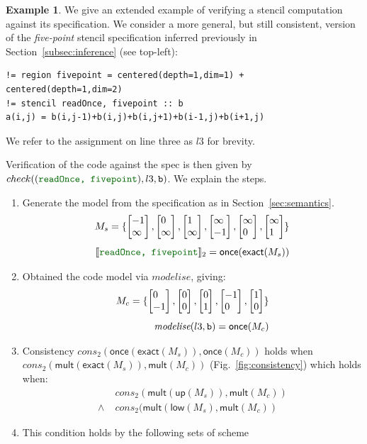 \documentclass[9pt]{sigplanconf}
\newcounter{block}
\theoremstyle{definition}
\newtheorem{example}[block]{Example}
\newcommand{\interp}[1]{\llbracket{#1}\rrbracket}
\newcommand{\vtwo}[2]{\setlength{\arraycolsep}{0em}
\left[\begin{array}{l}#1\\#2\end{array}\right]}
\begin{document}
\begin{example}
We give an extended example of verifying a stencil computation against
its specification. We consider a more general, but still consistent, version of the \textit{five-point}
stencil specification inferred previously in
Section~\ref{subsec:inference} (see top-left):
%
\begin{verbatim}
!= region fivepoint = centered(depth=1,dim=1) + centered(depth=1,dim=2)
!= stencil readOnce, fivepoint :: b
a(i,j) = b(i,j-1)+b(i,j)+b(i,j+1)+b(i-1,j)+b(i+1,j)
\end{verbatim}
%
We refer to the assignment on line three as $l3$ for brevity.

Verification of the code against the spec is then given by 
$check(({\textcolor{darkgreen}{\texttt{readOnce, fivepoint}}}),l3,\texttt{b})$. 
We explain the steps.
\begin{enumerate}  
%
\item Generate the model from the specification as in
  Section~\ref{sec:semantics}. 
%
\begin{align*}
 M_s= \{  \vtwo{-1}{\infty},
          \vtwo{0}{\infty},
          \vtwo{1}{\infty},
          \vtwo{\infty}{-1},
          \vtwo{\infty}{0},
        \vtwo{\infty}{1} \}  \\[0.4em]
\interp{{\textcolor{darkgreen}{\texttt{readOnce, fivepoint}}}}_2 =
  \textsf{once}(\textsf{exact} (M_s))
\end{align*}
%
\item Obtained the code model via $\textit{modelise}$, giving:
%
\begin{align*}
M_c = \{
    \vtwo{0}{-1},
    \vtwo{0}{0},
    \vtwo{0}{1},
    \vtwo{-1}{0},
    \vtwo{1}{0}
  \}
\\[0.4em]
\textit{modelise}(l3, \texttt{b}) = \textsf{once} (M_c)
\end{align*}
%
\item Consistency $cons_2(\textsf{once}(\textsf{exact}(M_s)),
  \textsf{once}(M_c))$ holds when 
  $\textit{cons}_2(\textsf{mult}(\textsf{exact}(M_s)),\textsf{mult}(M_c))$ (Fig.~\ref{fig:consistency}) 
  which holds when: 
  \begin{align*}
     & \textit{cons}_2(\textsf{mult}(\textsf{up}(M_s)),\textsf{mult}(M_c)) \\
   \wedge \; & \textit{cons}_2(\textsf{mult}(\textsf{low}(M_s),\textsf{mult}(M_c))
  \end{align*}
%
\item This condition holds by the following sets of scheme

\end{enumerate}
\end{example}
\end{document}
